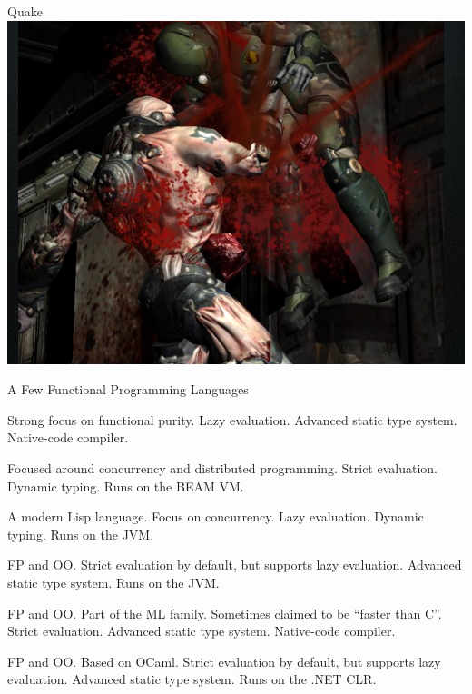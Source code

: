 \documentclass{beamer}
\begin{document}
\begin{frame}{Quake}
  \includegraphics[scale=0.4]{img/quake.png}
\end{frame}


\begin{frame}{A Few Functional Programming Languages}

  \begin{description}[<+->]
  \item [Haskell] Strong focus on functional purity. Lazy evaluation.
    Advanced static type system. Native-code compiler.
  \item [Erlang] Focused around concurrency and distributed
    programming. Strict evaluation. Dynamic typing. Runs on the BEAM VM.
  \item [Clojure] A modern Lisp language. Focus on concurrency. Lazy
    evaluation. Dynamic typing. Runs on the JVM.
  \item [Scala] FP and OO. Strict evaluation by default,
    but supports lazy evaluation. Advanced static type system. Runs on the JVM.
  \item [OCaml] FP and OO. Part of the ML family. Sometimes claimed to be ``faster
    than C''. Strict evaluation. Advanced static type system. Native-code compiler.
  \item [F\#] FP and OO. Based on OCaml. Strict evaluation by default,
    but supports lazy evaluation. Advanced static type system. Runs on
    the .NET CLR.
  \end{description}

\end{frame}
\end{document}
